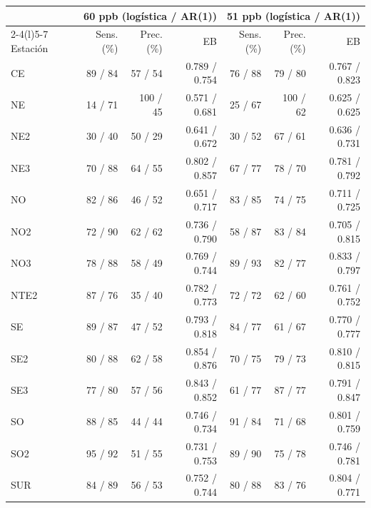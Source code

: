 \begin{tabular}{@{}lrrrrrr@{}}
\toprule
 & \multicolumn{3}{c}{60 ppb (logística / AR(1))} & \multicolumn{3}{c}{51 ppb (logística / AR(1))} \\
\cmidrule(lr){2-4}\cmidrule(l){5-7}
Estación & Sens. (\%) & Prec. (\%) & EB & Sens. (\%) & Prec. (\%) & EB \\
\midrule
CE & 89 / 84 & 57 / 54 & 0.789 / 0.754 & 76 / 88 & 79 / 80 & 0.767 / 0.823 \\
NE & 14 / 71 & 100 / 45 & 0.571 / 0.681 & 25 / 67 & 100 / 62 & 0.625 / 0.625 \\
NE2 & 30 / 40 & 50 / 29 & 0.641 / 0.672 & 30 / 52 & 67 / 61 & 0.636 / 0.731 \\
NE3 & 70 / 88 & 64 / 55 & 0.802 / 0.857 & 67 / 77 & 78 / 70 & 0.781 / 0.792 \\
NO & 82 / 86 & 46 / 52 & 0.651 / 0.717 & 83 / 85 & 74 / 75 & 0.711 / 0.725 \\
NO2 & 72 / 90 & 62 / 62 & 0.736 / 0.790 & 58 / 87 & 83 / 84 & 0.705 / 0.815 \\
NO3 & 78 / 88 & 58 / 49 & 0.769 / 0.744 & 89 / 93 & 82 / 77 & 0.833 / 0.797 \\
NTE2 & 87 / 76 & 35 / 40 & 0.782 / 0.773 & 72 / 72 & 62 / 60 & 0.761 / 0.752 \\
SE & 89 / 87 & 47 / 52 & 0.793 / 0.818 & 84 / 77 & 61 / 67 & 0.770 / 0.777 \\
SE2 & 80 / 88 & 62 / 58 & 0.854 / 0.876 & 70 / 75 & 79 / 73 & 0.810 / 0.815 \\
SE3 & 77 / 80 & 57 / 56 & 0.843 / 0.852 & 61 / 77 & 87 / 77 & 0.791 / 0.847 \\
SO & 88 / 85 & 44 / 44 & 0.746 / 0.734 & 91 / 84 & 71 / 68 & 0.801 / 0.759 \\
SO2 & 95 / 92 & 51 / 55 & 0.731 / 0.753 & 89 / 90 & 75 / 78 & 0.746 / 0.781 \\
SUR & 84 / 89 & 56 / 53 & 0.752 / 0.744 & 80 / 88 & 83 / 76 & 0.804 / 0.771 \\
\bottomrule
\end{tabular}
